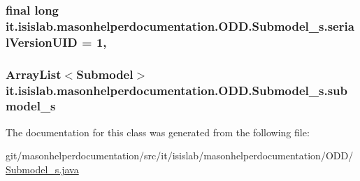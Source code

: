 \hypertarget{classit_1_1isislab_1_1masonhelperdocumentation_1_1_o_d_d_1_1_submodel__s_af0b04ffdf08b884274745f348e2bbc5f}{
\subsubsection[{serial\-Version\-U\-I\-D}]{\setlength{\rightskip}{0pt plus 5cm}final long it.\-isislab.\-masonhelperdocumentation.\-O\-D\-D.\-Submodel\-\_\-s.\-serial\-Version\-U\-I\-D = 1\hspace{0.3cm}{\ttfamily [static]}, {\ttfamily [private]}}}\label{classit_1_1isislab_1_1masonhelperdocumentation_1_1_o_d_d_1_1_submodel__s_af0b04ffdf08b884274745f348e2bbc5f}
\hypertarget{classit_1_1isislab_1_1masonhelperdocumentation_1_1_o_d_d_1_1_submodel__s_abf82b40f163d967edfba01b8050929d5}{
\subsubsection[{submodel\-\_\-s}]{\setlength{\rightskip}{0pt plus 5cm}Array\-List$<${\bf Submodel}$>$ it.\-isislab.\-masonhelperdocumentation.\-O\-D\-D.\-Submodel\-\_\-s.\-submodel\-\_\-s\hspace{0.3cm}{\ttfamily [private]}}}\label{classit_1_1isislab_1_1masonhelperdocumentation_1_1_o_d_d_1_1_submodel__s_abf82b40f163d967edfba01b8050929d5}


The documentation for this class was generated from the following file\-:\begin{DoxyCompactItemize}
\item 
git/masonhelperdocumentation/src/it/isislab/masonhelperdocumentation/\-O\-D\-D/\hyperlink{_submodel__s_8java}{Submodel\-\_\-s.\-java}\end{DoxyCompactItemize}
